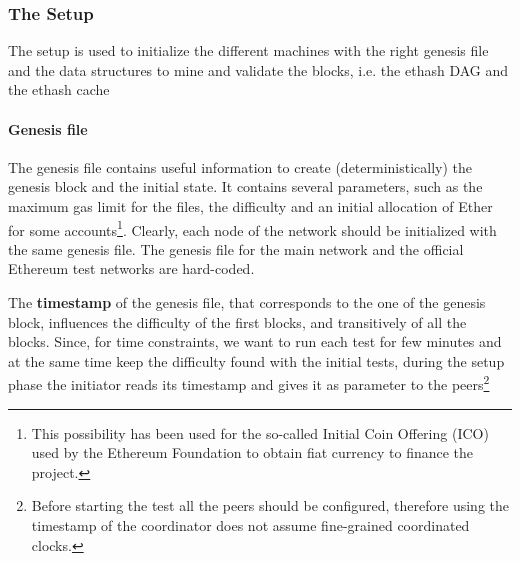 \subsubsection{The Setup}
The setup is used to initialize the different machines with the right genesis
file and the data structures to mine and validate the blocks,  i.e.
the ethash DAG and the ethash cache

\paragraph{Genesis file}

The genesis file contains useful information to create (deterministically)
the genesis block and the initial state. It contains several parameters, such as
the maximum gas limit for the files, the difficulty and an initial allocation of
Ether for some accounts\footnote{This possibility has been used for the
so-called Initial Coin Offering (ICO) used by the Ethereum Foundation to obtain
fiat currency to finance the project.}. Clearly, each node of the network should
be initialized with the same genesis file. The genesis file for the main network
and the official Ethereum test networks are hard-coded.

The \textbf{timestamp} of the genesis file, that corresponds to the one of the
genesis block, influences the difficulty of the first blocks, and transitively
of all the blocks.
Since, for time constraints, we want to run each test for few minutes and
at the same time keep the difficulty found with the initial tests,
during the setup phase the initiator reads its timestamp and gives it
as parameter to the peers\footnote{Before starting the test all the
peers should be configured, therefore using the timestamp of the coordinator
does not assume fine-grained coordinated clocks.}

